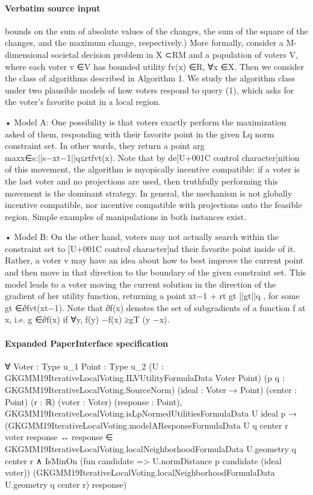 \documentclass[10pt]{article}
\begin{document}
\paragraph{Verbatim source input}
\begin{ReviewVerbatim}
bounds on the sum of absolute values of the changes, the sum of the square of the changes,
and the maximum change, respectively.)
More formally, consider a M-dimensional societal decision problem in X ⊂RM and a
population of voters V, where each voter v ∈V has bounded utility fv(x) ∈R, ∀x ∈X.
Then we consider the class of algorithms described in Algorithm 1. We study the algorithm
class under two plausible models of how voters respond to query (1), which asks for the
voter's favorite point in a local region.

• Model A:
One possibility is that voters exactly perform the maximization asked of
them, responding with their favorite point in the given Lq norm constraint set. In other
words, they return a point arg maxx∈{s:||s−xt−1||q≤rt}fvt(x). Note that by de[U+001C control character]nition of this
movement, the algorithm is myopically incentive compatible: if a voter is the last voter
and no projections are used, then truthfully performing this movement is the dominant
strategy. In general, the mechanism is not globally incentive compatible, nor incentive
compatible with projections onto the feasible region. Simple examples of manipulations
in both instances exist.

• Model B: On the other hand, voters may not actually search within the constraint set
to [U+001C control character]nd their favorite point inside of it. Rather, a voter v may have an idea about how
to best improve the current point and then move in that direction to the boundary of
the given constraint set. This model leads to a voter moving the current solution in the
direction of the gradient of her utility function, returning a point xt−1 + rt
gt
||gt||q , for some
gt ∈∂fvt(xt−1). Note that ∂f(x) denotes the set of subgradients of a function f at x, i.e.
g ∈∂f(x) if ∀y, f(y) −f(x) ≥gT (y −x).
\end{ReviewVerbatim}


\paragraph{Expanded PaperInterface specification}
\begin{ReviewVerbatim}
∀ {Voter : Type u_1} {Point : Type u_2} (U : GKGMM19IterativeLocalVoting.ILVUtilityFormulaData Voter Point)
  (p q : GKGMM19IterativeLocalVoting.SourceNorm) (ideal : Voter → Point) (center : Point) (r : ℝ) (voter : Voter)
  (response : Point),
  GKGMM19IterativeLocalVoting.isLpNormedUtilitiesFormulaData U ideal p →
    (GKGMM19IterativeLocalVoting.modelAResponseFormulaData U q center r voter response ↔
      response ∈ GKGMM19IterativeLocalVoting.localNeighborhoodFormulaData U.geometry q center r ∧
        IsMinOn (fun candidate => U.normDistance p candidate (ideal voter))
          (GKGMM19IterativeLocalVoting.localNeighborhoodFormulaData U.geometry q center r) response)
\end{ReviewVerbatim}
\end{document}
